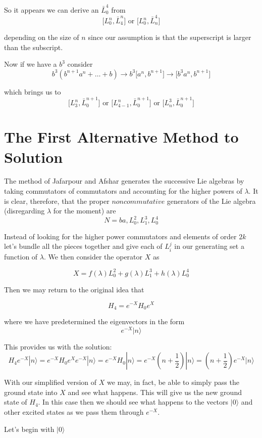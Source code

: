 \documentclass{article}
\newcommand{\lrbrack}[2]{\lbrack #1 , #2 \rbrack}
\begin{document}
So it appears we can derive an $\bar{L}_0^4$ from
\[
\lrbrack{L_0^n}{\bar{L}_4^n} \textrm{ or } \lrbrack{L_0^n}{\bar{L}_n^4}
\]

depending on the size of $n$ since our assumption is that the superscript is larger than the subscript.


Now if we have a $b^3$ consider
\[
b^3 (b^{n+1}a^n + \dots + b) \rightarrow b^3\lrbrack{a^n}{b^{n+1}}
\rightarrow \lrbrack{b^3 a^n}{b^{n+1}}
\]

which brings us to
\[
\lrbrack{L_3^n}{\bar{L}_0^{n+1}} \textrm{ or } \lrbrack{L_{4-1}^n}{\bar{L}_0^{n+1}} \textrm{ or } \lrbrack{L_n^3}{\bar{L}_0^{n+1}}
\]

\section*{The First Alternative Method to Solution}

The method of Jafarpour and Afshar generates the successive Lie algebras by taking commutators of commutators and accounting for the higher powers of $\lambda$.  It is clear, therefore, that the proper $noncommutative$ generators of the Lie algebra (disregarding $\lambda$ for the moment) are
\[
N = ba, L_0^2, L_1^3, L_0^4
\]

Instead of looking for the higher power commutators and elements of order $2k$ let's bundle all the pieces together and give each of $L_i^j$ in our generating set a function of $\lambda$.  We then consider the operator $X$ as

\[
X = f(\lambda) L_0^2 + g(\lambda) L_1^3 + h(\lambda) L_0^4
\]

Then we may return to the original idea that

\[
H_4 = e^{-X}H_0 e^X
\]

where we have predetermined the eigenvectors in the form
\[
e^{-X} |n\rangle
\]

This provides us with the solution:
\[
H_4 e^{-X}|n\rangle = e^{-X}H_0e^{X}e^{-X}|n\rangle = e^{-X}H_0|n\rangle = e^{-X}(n+\frac{1}{2})|n\rangle = (n+\frac{1}{2})e^{-X}|n\rangle
\]	


With our simplified version of $X$ we may, in fact, be able to simply pass the ground state into $X$ and see what happens.  This will give us the new ground state of $H_4$.  In this case then we should see what happens to the vectors $|0\rangle$ and other excited states as we pass them through $e^{-X}$.


Let's begin with $|0\rangle$
\end{document}
